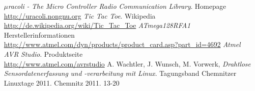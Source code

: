 \documentclass{clt2012}
\begin{document}
\begin{thebibliography}{XX}
    \emph{$\mu{}$racoli - The Micro Controller Radio Communication Library}. Homepage\\
    \url{http://uracoli.nongnu.org}
	\emph{Tic Tac Toe}. Wikipedia\\
	\url{http://de.wikipedia.org/wiki/Tic_Tac_Toe}
	\emph{ATmega128RFA1} Herstellerinformationen\\
	\url{http://www.atmel.com/dyn/products/product_card.asp?part_id=4692}
	\emph{Atmel AVR Studio}. Produktseite\\
	\url{http://www.atmel.com/avrstudio}
	A. Wachtler, J. Wunsch, M. Vorwerk, \emph{Drahtlose Sensordatenerfassung und -ver\-arbeitung mit Linux}. 
    Tagungsband Chemnitzer Linuxtage 2011. Chemnitz 2011. 13-20
\end{thebibliography}
\end{document}
